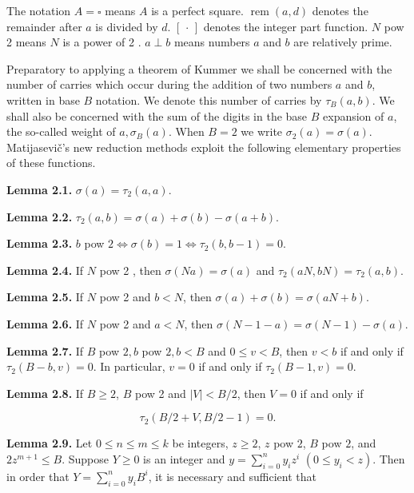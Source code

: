 \documentclass[11pt,a4paper]{article}
\newcommand{\origpage}[1]{\marginnote{\footnotesize\textbf{[#1]}}}
\begin{document}
The notation $A=\square$ means $A$ is a perfect square. $\operatorname{rem}(a,\allowbreak  d)$ denotes the remainder after $a$ is divided by $d$. $[\,\allowbreak \cdot\,\allowbreak ]$ denotes the integer part function. $N$ pow 2 means $N$ is a power of 2 . $a \perp b$ means numbers $a$ and $b$ are relatively prime.

Preparatory to applying a theorem of Kummer we shall be concerned with the number of carries which occur during the addition of two numbers $a$ and $b$, written in base $B$ notation. We denote this number of carries by $\tau_{B}(a,\allowbreak  b)$. We shall also be concerned with the sum of the digits in the base $B$ expansion of $a$, the so-called weight of $a,\allowbreak  \sigma_{B}(a)$. When $B=2$ we write $\sigma_{2}(a)=\sigma(a)$. Matijasevič's new reduction methods exploit the following elementary properties of these functions.

\noindent\textbf{Lemma 2.1.} $\sigma(a)=\tau_{2}(a,\allowbreak  a)$.

\noindent\textbf{Lemma 2.2.} $\tau_{2}(a,\allowbreak  b)=\sigma(a)+\sigma(b)-\sigma(a+b)$.

\noindent\textbf{Lemma 2.3.} $b$ pow $2 \Leftrightarrow \sigma(b)=1 \Leftrightarrow \tau_{2}(b,\allowbreak  b-1)=0$.

\noindent\textbf{Lemma 2.4.} If $N$ pow 2 , then $\sigma(N a)=\sigma(a)$ and $\tau_{2}(a N,\allowbreak  b N)=\tau_{2}(a,\allowbreak  b)$.

\noindent\textbf{Lemma 2.5.} If $N$ pow 2 and $b<N$, then $\sigma(a)+\sigma(b)=\sigma(a N+b)$.

\noindent\textbf{Lemma 2.6.} If $N$ pow 2 and $a<N$, then $\sigma(N-1-a)=\sigma(N-1)-\sigma(a)$.

\noindent\textbf{Lemma 2.7.} If $B$ pow $2,\allowbreak  b$ pow $2,\allowbreak  b<B$ and $0 \leq v<B$, then $v<b$ if and only if $\tau_{2}(B-b,\allowbreak  v)=0$. In particular, $v=0$ if and only if $\tau_{2}(B-1,\allowbreak  v)=0$.

\noindent\textbf{Lemma 2.8.}\origpage{554} If $B\geq2$, $B$ pow 2 and $|V|<B / 2$, then $V=0$ if and only if

\[
\tau_{2}(B / 2+V, B / 2-1)=0 .
\]

\noindent\textbf{Lemma 2.9.} Let $0 \leq n \leq m \leq k$ be integers, $z\geq2$, $z$ pow $2$, $B$ pow $2$, and $2z^{m+1}\leq B$. Suppose $Y\geq0$ is an integer and $y=\sum_{i=0}^{n} y_{i} z^{i}$ $\left(0 \leq y_{i}<z\right)$. Then in order that $Y=\sum_{i=0}^{n} y_{i} B^{i}$, it is necessary and sufficient that
\end{document}
